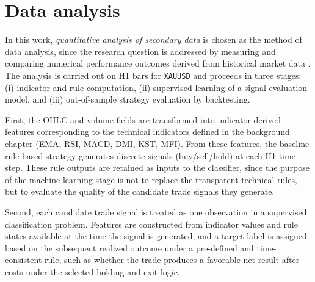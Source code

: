 



\section{Data analysis}

In this work, \emph{quantitative analysis of secondary data} is chosen as the
method of data analysis, since the research question is addressed by measuring
and comparing numerical performance outcomes derived from historical market
data \citep{johnston2014secondary, taherdoost2021data}. The analysis is carried
out on H1 bars for \texttt{XAUUSD} and proceeds in three stages: (i) indicator
and rule computation, (ii) supervised learning of a signal evaluation model,
and (iii) out-of-sample strategy evaluation by backtesting.

First, the OHLC and volume fields are transformed into indicator-derived
features corresponding to the technical indicators defined in the background
chapter (EMA, RSI, MACD, DMI, KST, MFI). From these features, the baseline
rule-based strategy generates discrete signals (buy/sell/hold) at each H1 time
step. These rule outputs are retained as inputs to the classifier, since the
purpose of the machine learning stage is not to replace the transparent
technical rules, but to evaluate the quality of the candidate trade signals they
generate.

Second, each candidate trade signal is treated as one observation in a
supervised classification problem. Features are constructed from indicator
values and rule states available at the time the signal is generated, and a
target label is assigned based on the subsequent realized outcome under a
pre-defined and time-consistent rule, such as whether the trade produces a
favorable net result after costs under the selected holding and exit logic.

